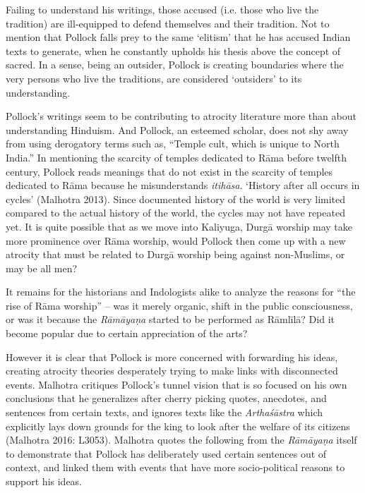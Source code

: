 Failing to understand his writings, those accused (i.e. those who live the tradition) are ill-equipped to defend themselves and their tradition. Not to mention that Pollock falls prey to the same ‘elitism’ that he has accused Indian texts to generate, when he constantly upholds his thesis above the concept of sacred. In a sense, being an outsider, Pollock is creating boundaries where the very persons who live the traditions, are considered ‘outsiders’ to its understanding.

Pollock’s writings seem to be contributing to atrocity literature more than about understanding Hinduism. And Pollock, an esteemed scholar, does not shy away from using derogatory terms such as, “Temple cult, which is unique to North India.” In mentioning the scarcity of temples dedicated to Rāma before twelfth century, Pollock reads meanings that do not exist in the scarcity of temples dedicated to Rāma because he misunderstands \textit{itihāsa}. ‘History after all occurs in cycles’ (Malhotra 2013). Since documented history of the world is very limited compared to the actual history of the world, the cycles may not have repeated yet. It is quite possible that as we move into Kaliyuga, Durgā worship may take more prominence over Rāma worship, would Pollock then come up with a new atrocity that must be related to Durgā worship being against non-Muslims, or may be all men?

It remains for the historians and Indologists alike to analyze the reasons for “the rise of Rāma worship” – was it merely organic, shift in the public consciousness, or was it because the \textit{Rāmāyaṇa} started to be performed as Rāmlīlā? Did it become popular due to certain appreciation of the arts?

However it is clear that Pollock is more concerned with forwarding his ideas, creating atrocity theories desperately trying to make links with disconnected events. Malhotra critiques Pollock’s tunnel vision that is so focused on his own conclusions that he generalizes after cherry picking quotes, anecdotes, and sentences from certain texts, and ignores texts like the \textit{Arthaśāstra} which explicitly lays down grounds for the king to look after the welfare of its citizens (Malhotra 2016: L3053). Malhotra quotes the following from the \textit{Rāmāyaṇa} itself to demonstrate that Pollock has deliberately used certain sentences out of context, and linked them with events that have more socio-political reasons to support his ideas.

